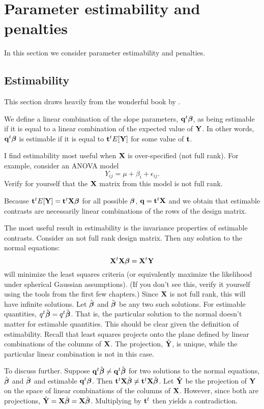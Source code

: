 \chapter{Parameter estimability and penalties}

In this section we consider parameter estimability and penalties. 

\section{Estimability}

This section draws heavily from the wonderful book by \cite{searle2012linear}.

We define a linear combination of the slope parameters, $\mathbf{q}^t \boldsymbol{\beta}$, as being estimable
if it is equal to a linear combination of the expected value of $\mathbf{Y}$. In other words,
$\mathbf{q}^t \boldsymbol{\beta}$ is estimable if it is equal to $\mathbf{t}^t E[\mathbf{Y}]$ for some value of $\mathbf{t}$.

I find estimability most useful when $\mathbf{X}$ is over-specified (not full rank). For example,
consider an ANOVA model
$$
Y_{ij} = \mu + \beta_i + \epsilon_{ij}.
$$
Verify for yourself that the $\mathbf{X}$ matrix from this model is not full rank. 

Because $\mathbf{t}^t E[\mathbf{Y}] = \mathbf{t}^t \mathbf{X} \boldsymbol{\beta}$ for all possible $\boldsymbol{\beta}$, $\mathbf{q} = \mathbf{t}^t \mathbf{X}$ and
we obtain that estimable contrasts are necessarily linear combinations of the rows
of the design matrix. 

The most useful result in estimability is the invariance properties of estimable contrasts. Consider an not full rank design matrix.
Then any solution to the normal equations:
$$
\mathbf{X}^t \mathbf{X} \boldsymbol{\beta} = \mathbf{X}^t \mathbf{Y}
$$
will minimize the least squares criteria (or equivalently maximize the likelihood
under spherical Gaussian assumptions). (If you don't see this, verify it yourself using
the tools from the first few chapters.) Since $\mathbf{X}$ is not full rank, this will
have infinite solutions. Let $\hat {\boldsymbol{\beta}}$ and $\tilde {\boldsymbol{\beta}}$ be any two such
solutions. For estimable quantities, $q^t \hat {\boldsymbol{\beta}} = q^t \tilde {\boldsymbol{\beta}}$. 
That is, the particular solution to the normal doesn't matter for estimable quantities. This should be
clear given the definition of estimability. Recall that least squares projects
onto the plane defined by linear combinations of the columns of $\mathbf{X}$. The projection,
$\hat {\mathbf{Y}}$, is unique, while the particular linear combination is not in this case.

To discuss further. Suppose $\mathbf{q}^t \hat {\boldsymbol{\beta}} \neq \mathbf{q}^t \tilde {\boldsymbol{\beta}}$
for two solutions to the normal equations, $\hat {\boldsymbol{\beta}}$ and $\tilde {\boldsymbol{\beta}}$
and estimable $\mathbf{q}^t \boldsymbol{\beta}$. Then $\mathbf{t}^t \mathbf{X} \hat {\boldsymbol{\beta}} \neq \mathbf{t}^t \mathbf{X} \tilde {\boldsymbol{\beta}}$. Let
$\hat {\mathbf{Y}}$ be the projection of $\mathbf{Y}$ on the space of linear combinations of the columns of $\mathbf{X}$.
However, since both are projections, $\hat {\mathbf{Y}} = \mathbf{X} \hat {\boldsymbol{\beta}} = \mathbf{X} \tilde {\boldsymbol{\beta}}$. 
Multiplying by $\mathbf{t}^t$ then yields a contradiction.

